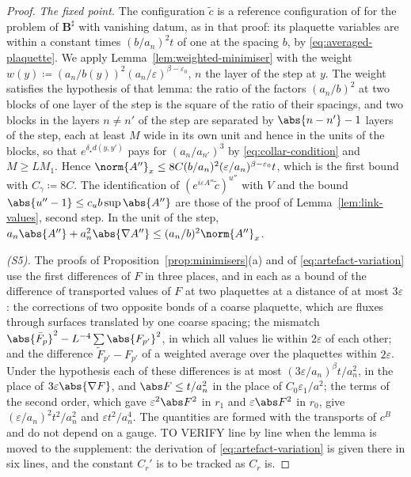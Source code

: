 \begin{proof}
\emph{The fixed point.} The configuration $\tilde c$ is a reference configuration of \cite[Proposition~5]{BalabanVAR} for the problem of $\mathbf B^\sharp$ with vanishing datum, as in that proof: its plaquette variables are within a constant times $(b/a_n)^2t$ of one at the spacing $b$, by \eqref{eq:averaged-plaquette}. We apply Lemma~\ref{lem:weighted-minimiser} with the weight $w(y) \coloneqq (a_n/b(y))^2(a_n/\varepsilon)^{\beta-\varepsilon_0}$, $n$ the layer of the step at $y$. The weight satisfies the hypothesis of that lemma: the ratio of the factors $(a_n/b)^2$ at two blocks of one layer of the step is the square of the ratio of their spacings, and two blocks in the layers $n \neq n'$ of the step are separated by $\abs{n - n'} - 1$ layers of the step, each at least $M$ wide in its own unit and hence in the units of the blocks, so that $e^{\delta_\star d(y,y')}$ pays for $(a_n/a_{n'})^3$ by \eqref{eq:collar-condition} and $M \geq LM_1$. Hence $\norm{A''}_x \leq 8C(b/a_n)^2(\varepsilon/a_n)^{\beta-\varepsilon_0}t$, which is the first bound with $C_\gamma \coloneqq 8C$. The identification of $(e^{i\varepsilon A''}\tilde c)^{u''}$ with $V$ and the bound $\abs{u'' - 1} \leq c_ub\sup\abs{A''}$ are those of the proof of Lemma~\ref{lem:link-values}, second step. In the unit of the step, $a_n\abs{A''} + a_n^2\abs{\nabla A''} \leq (a_n/b)^2\norm{A''}_x$.

\emph{(S5).} The proofs of Proposition~\ref{prop:minimisers}(a) and of \eqref{eq:artefact-variation} use the first differences of $F$ in three places, and in each as a bound of the difference of transported values of $F$ at two plaquettes at a distance of at most $3\varepsilon$: the corrections of two opposite bonds of a coarse plaquette, which are fluxes through surfaces translated by one coarse spacing; the mismatch $\abs{\bar F_p}^2 - L^{-4}\sum\abs{F_{p'}}^2$, in which all values lie within $2\varepsilon$ of each other; and the difference $\tilde F_{p'} - F_{p'}$ of a weighted average over the plaquettes within $2\varepsilon$. Under the hypothesis each of these differences is at most $(3\varepsilon/a_n)^\beta t/a_n^2$, in the place of $3\varepsilon\abs{\nabla F}$, and $\abs F \leq t/a_n^2$ in the place of $C_0\varepsilon_1/a^2$; the terms of the second order, which gave $\varepsilon^2\abs F^2$ in $r_1$ and $\varepsilon\abs F^2$ in $r_0$, give $(\varepsilon/a_n)^2t^2/a_n^2$ and $\varepsilon t^2/a_n^4$. The quantities are formed with the transports of $c^B$ and do not depend on a gauge. TO VERIFY line by line when the lemma is moved to the supplement: the derivation of \eqref{eq:artefact-variation} is given there in six lines, and the constant $C_r'$ is to be tracked as $C_r$ is.
\end{proof}

